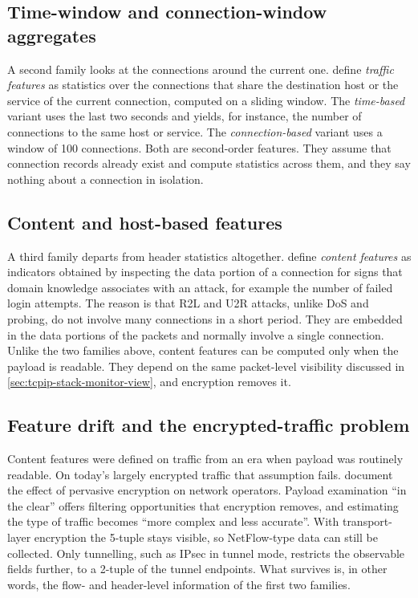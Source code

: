 \subsection{Time-window and connection-window aggregates}
\label{sec:time-window-connection-aggregates}

A second family looks at the connections around the current one.
\citet{tavallaee2009kddcup99} define \emph{traffic features} as statistics
over the connections that share the destination host or the service of the
current connection, computed on a sliding window. The \emph{time-based}
variant uses the last two seconds and yields, for instance, the number of
connections to the same host or service. The \emph{connection-based} variant
uses a window of 100 connections. Both are second-order features. They
assume that connection records already exist and compute statistics across
them, and they say nothing about a connection in isolation.

\subsection{Content and host-based features}
\label{sec:content-host-based-features}

A third family departs from header statistics altogether.
\citet{tavallaee2009kddcup99} define \emph{content features} as indicators
obtained by inspecting the data portion of a connection for signs that
domain knowledge associates with an attack, for example the number of
failed login attempts. The reason is that R2L and U2R attacks, unlike DoS
and probing, do not involve many connections in a short period. They are
embedded in the data portions of the packets and normally involve a single
connection. Unlike the two families above, content features can be computed
only when the payload is readable. They depend on the same packet-level
visibility discussed in \cref{sec:tcpip-stack-monitor-view}, and encryption
removes it.

\subsection{Feature drift and the encrypted-traffic problem}
\label{sec:feature-drift-encrypted-traffic}

Content features were defined on traffic from an era when payload was
routinely readable. On today's largely encrypted traffic that assumption
fails. \citet{moriarty2018rfc8404} document the effect of pervasive
encryption on network operators. Payload examination ``in the clear'' offers
filtering opportunities that encryption removes, and estimating the type of
traffic becomes ``more complex and less accurate''. With transport-layer
encryption the 5-tuple stays visible, so NetFlow-type data can still be
collected. Only tunnelling, such as IPsec in tunnel mode, restricts the
observable fields further, to a 2-tuple of the tunnel endpoints. What
survives is, in other words, the flow- and header-level information of the
first two families.

